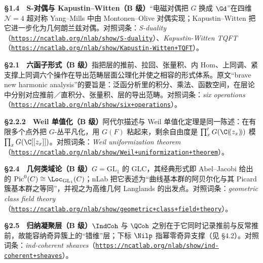 \smallskip
\noindent\textbf{§1.4　S-对偶与 Kapustin--Witten（B 级）}\quad “电磁对偶把 $G$ 换成 $\Gd$”在四维 $\mathcal{N}=4$ 超对称 Yang--Mills 中由 Montonen--Olive 对偶实现；Kapustin--Witten 把它进一步化为几何朗兰兹对偶。对照词条：\emph{S-duality}（\href{https://ncatlab.org/nlab/show/S-duality}{\texttt{https:/\allowbreak{}/\allowbreak{}ncatlab.\allowbreak{}org/\allowbreak{}nlab/\allowbreak{}show/\allowbreak{}S-duality}}）、\emph{Kapustin-Witten TQFT}（\href{https://ncatlab.org/nlab/show/Kapustin-Witten+TQFT}{\texttt{https:/\allowbreak{}/\allowbreak{}ncatlab.\allowbreak{}org/\allowbreak{}nlab/\allowbreak{}show/\allowbreak{}Kapustin-Witten+\allowbreak{}TQFT}}）。

\smallskip
\noindent\textbf{§2.1　六函子形式（B 级）}\quad 指把层的推前、拉回、张量积、内 Hom、上同调、紧支撑上同调六个操作在导出范畴层面公理化并使之相容的形式体系。原文“brave new harmonic analysis”的要旨是：泛函分析里的积分、乘法、函数空间，在层论中分别对应推前／直积分、张量积、层的导出范畴。对照词条：\emph{six operations}（\href{https://ncatlab.org/nlab/show/six+operations}{\texttt{https:/\allowbreak{}/\allowbreak{}ncatlab.\allowbreak{}org/\allowbreak{}nlab/\allowbreak{}show/\allowbreak{}six+\allowbreak{}operations}}）。

\smallskip
\noindent\textbf{§2.2.2　Weil 单值化（B 级）}\quad 阿代尔描述与 Weil 单值化定理是同一陈述：在有限多个点外把 $G$-丛平凡化，用 $G(F)$ 粘起来，剩余自由度是 $\prod'_{x}G(\C(\!(z_{x})\!))$ 模 $\prod_{x}G(\C[[z_{x}]])$。对照词条：\emph{Weil uniformization theorem}（\href{https://ncatlab.org/nlab/show/Weil+uniformization+theorem}{\texttt{https:/\allowbreak{}/\allowbreak{}ncatlab.\allowbreak{}org/\allowbreak{}nlab/\allowbreak{}show/\allowbreak{}Weil+\allowbreak{}uniformization+\allowbreak{}theorem}}）。

\smallskip
\noindent\textbf{§2.4　几何类域论（B 级）}\quad $G=\mathrm{GL}_{1}$ 的 GLC，其经典形式即 Abel--Jacobi 给出的 $\mathrm{Pic}^{0}(C)\cong\Loc_{\mathrm{GL}_{1}}(C)$；nLab 把它表述为“曲线基本群的阿贝尔化与其 Picard 簇基本群之等同”，并视之为高维几何 Langlands 的出发点。对照词条：\emph{geometric class field theory}（\href{https://ncatlab.org/nlab/show/geometric+class+field+theory}{\texttt{https:/\allowbreak{}/\allowbreak{}ncatlab.\allowbreak{}org/\allowbreak{}nlab/\allowbreak{}show/\allowbreak{}geometric+\allowbreak{}class+\allowbreak{}field+\allowbreak{}theory}}）。

\smallskip
\noindent\textbf{§2.5　归纳凝聚层（B 级）}\quad $\IndCoh$ 与 $\QCoh$ 之别在于它同时记录推前与反常推前，故能容纳奇异簇上的“错维”层；下标 $\Nilp$ 指幂零奇异支撑（见 §4.2）。对照词条：\emph{ind-coherent sheaves}（\href{https://ncatlab.org/nlab/show/ind-coherent+sheaves}{\texttt{https:/\allowbreak{}/\allowbreak{}ncatlab.\allowbreak{}org/\allowbreak{}nlab/\allowbreak{}show/\allowbreak{}ind-coherent+\allowbreak{}sheaves}}）。

